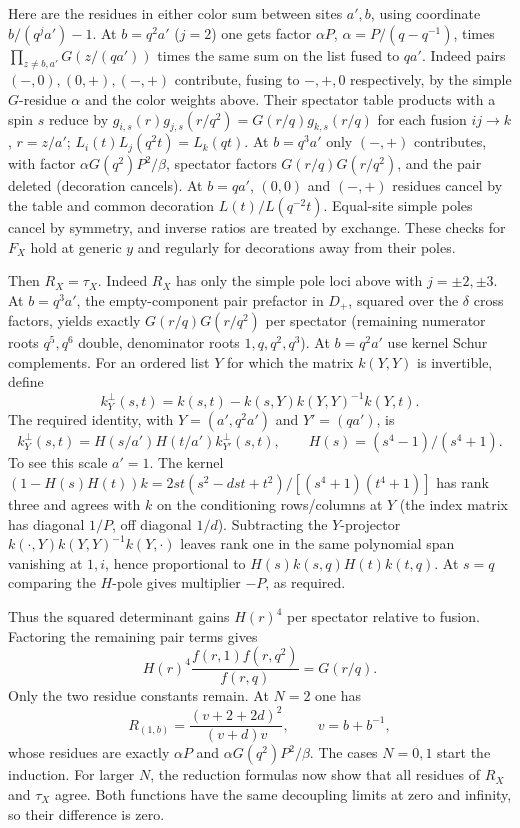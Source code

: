 Here are the residues in either color sum between sites \(a',b\), using coordinate \(b/(q^j a')-1\). At \(b=q^2a'\) (\(j=2\)) one gets factor \(\alpha P\), \(\alpha=P/(q-q^{-1})\), times \(\prod_{z\ne b,a'} G(z/(q a'))\) times the same sum on the list fused to \(q a'\). Indeed pairs \((-,0),(0,+),(-,+)\) contribute, fusing to \(-,+,0\) respectively, by the simple \(G\)-residue \(\alpha\) and the color weights above. Their spectator table products with a spin \(s\) reduce by
\(g_{i,s}(r)g_{j,s}(r/q^2)=G(r/q)g_{k,s}(r/q)\)
for each fusion \(ij\to k\), \(r=z/a'\); \(L_i(t)L_j(q^2t)=L_k(qt)\). At \(b=q^3 a'\) only \((-,+)\) contributes, with factor \(\alpha G(q^2)P^2/\beta\), spectator factors \(G(r/q)G(r/q^2)\), and the pair deleted (decoration cancels). At \(b=q a'\), \((0,0)\) and \((-,+)\) residues cancel by the table and common decoration \(L(t)/L(q^{-2}t)\). Equal-site simple poles cancel by symmetry, and inverse ratios are treated by exchange. These checks for \(F_X\) hold at generic \(y\) and regularly for decorations away from their poles.

Then \(R_X=\tau_X\). Indeed \(R_X\) has only the simple pole loci above with \(j=\pm2,\pm3\). At \(b=q^3a'\), the empty-component pair prefactor in \(D_+\), squared over the \(\delta\) cross factors, yields exactly \(G(r/q)G(r/q^2)\) per spectator (remaining numerator roots \(q^5,q^6\) double, denominator roots \(1,q,q^2,q^3\)). At \(b=q^2a'\) use kernel Schur complements. For an ordered list $Y$ for which the
matrix $k(Y,Y)$ is invertible, define
\[
 k_Y^\perp(s,t)=k(s,t)-k(s,Y)k(Y,Y)^{-1}k(Y,t).
\]
The required identity, with \(Y=(a',q^2a')\) and \(Y'=(qa')\), is
\[
 k_Y^\perp(s,t)=H(s/a')H(t/a') k_{Y'}^\perp(s,t),\qquad H(s)=(s^4-1)/(s^4+1).
\]
To see this scale \(a'=1\). The kernel \((1-H(s)H(t))k=2st(s^2-dst+t^2)/[(s^4+1)(t^4+1)]\) has rank three and agrees with \(k\) on the conditioning rows/columns at \(Y\) (the index matrix has diagonal \(1/P\), off diagonal \(1/d\)). Subtracting the \(Y\)-projector \(k(\cdot,Y)k(Y,Y)^{-1}k(Y,\cdot)\) leaves rank one in the same polynomial span vanishing at \(1,i\), hence proportional to \(H(s)k(s,q)H(t)k(t,q)\). At \(s=q\) comparing the \(H\)-pole gives multiplier \(-P\), as required.

Thus the squared determinant gains $H(r)^4$ per spectator relative to
fusion. Factoring the remaining pair terms gives
\[
 H(r)^4\frac{f(r,1)f(r,q^2)}{f(r,q)}=G(r/q).
\]
Only the two residue constants remain. At $N=2$ one has
\[
 R_{(1,b)}=\frac{(v+2+2d)^2}{(v+d)v},\qquad v=b+b^{-1},
\]
whose residues are exactly $\alpha P$ and
$\alpha G(q^2)P^2/\beta$. The cases $N=0,1$ start the induction.
For larger $N$, the reduction formulas now show that all residues of
$R_X$ and $\tau_X$ agree. Both functions have the same decoupling limits
at zero and infinity, so their difference is zero.


